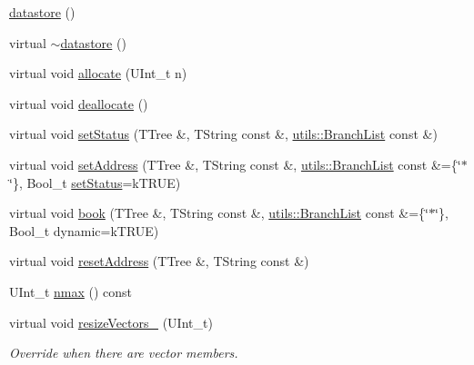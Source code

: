 \begin{DoxyCompactItemize}
\item 
\hyperlink{structpanda_1_1ContainerElement_1_1datastore_a6586ef55fd04ee9539982816dc70e274}{datastore} ()
\item 
virtual \hyperlink{structpanda_1_1ContainerElement_1_1datastore_a1df10bf442f46fcc1cb966befdfb24f1}{$\sim$datastore} ()
\item 
virtual void \hyperlink{structpanda_1_1ContainerElement_1_1datastore_ae203568d73154e9890a7d6d00e6b6301}{allocate} (U\-Int\-\_\-t n)
\item 
virtual void \hyperlink{structpanda_1_1ContainerElement_1_1datastore_a8827cbb1304b781fcba764a6bf4cbcc1}{deallocate} ()
\item 
virtual void \hyperlink{structpanda_1_1ContainerElement_1_1datastore_aad03a4d0428dfa3b6ae9ccfb04d49cd8}{set\-Status} (T\-Tree \&, T\-String const \&, \hyperlink{classpanda_1_1utils_1_1BranchList}{utils\-::\-Branch\-List} const \&)
\item 
virtual void \hyperlink{structpanda_1_1ContainerElement_1_1datastore_ae59f1a9b346ef85225e9b3691c6728a1}{set\-Address} (T\-Tree \&, T\-String const \&, \hyperlink{classpanda_1_1utils_1_1BranchList}{utils\-::\-Branch\-List} const \&=\{\char`\"{}$\ast$\char`\"{}\}, Bool\-\_\-t \hyperlink{structpanda_1_1ContainerElement_1_1datastore_aad03a4d0428dfa3b6ae9ccfb04d49cd8}{set\-Status}=k\-T\-R\-U\-E)
\item 
virtual void \hyperlink{structpanda_1_1ContainerElement_1_1datastore_a3a4062043d9a913acd4056ab1cf5a93f}{book} (T\-Tree \&, T\-String const \&, \hyperlink{classpanda_1_1utils_1_1BranchList}{utils\-::\-Branch\-List} const \&=\{\char`\"{}$\ast$\char`\"{}\}, Bool\-\_\-t dynamic=k\-T\-R\-U\-E)
\item 
virtual void \hyperlink{structpanda_1_1ContainerElement_1_1datastore_a1f296453b1f2e440d9b4be3388069d43}{reset\-Address} (T\-Tree \&, T\-String const \&)
\item 
U\-Int\-\_\-t \hyperlink{structpanda_1_1ContainerElement_1_1datastore_aff3ea42523fa1d980435a5085c8f1289}{nmax} () const 
\item 
virtual void \hyperlink{structpanda_1_1ContainerElement_1_1datastore_ac050bf7055f0c53b4aff4234e2de6e20}{resize\-Vectors\-\_\-} (U\-Int\-\_\-t)
\begin{DoxyCompactList}\small\item\em Override when there are vector members. \end{DoxyCompactList}\end{DoxyCompactItemize}
